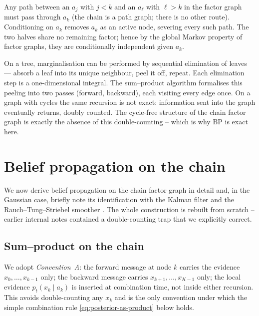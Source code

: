 \documentclass[11pt]{article}
\theoremstyle{definition}
\begin{document}
\begin{derivation}
Any path between an \(a_j\) with \(j < k\) and an \(a_\ell\) with
\(\ell > k\) in the factor graph must pass through \(a_k\) (the chain
is a path graph; there is no other route). Conditioning on \(a_k\)
removes \(a_k\) as an active node, severing every such path. The two
halves share no remaining factor; hence by the global Markov property
of factor graphs, they are conditionally independent given \(a_k\).
\end{derivation}

\begin{intuition}
On a tree, marginalisation can be performed by sequential elimination
of leaves --- absorb a leaf into its unique neighbour, peel it off,
repeat. Each elimination step is a one-dimensional integral. The
sum--product algorithm \citep{Pearl1988, KschischangFreyLoeliger2001}
formalises this peeling into two passes (forward, backward), each
visiting every edge once. On a graph with cycles the same recursion
is not exact: information sent into the graph eventually returns,
doubly counted. The cycle-free structure of the chain factor graph is
exactly the absence of this double-counting -- which is why BP is
exact here.
\end{intuition}

\section{Belief propagation on the chain}\label{sec:bp}

We now derive belief propagation \citep{Pearl1988,
KschischangFreyLoeliger2001} on the chain factor graph in detail and,
in the Gaussian case, briefly note its identification with the Kalman
filter \citep{Kalman1960} and the Rauch--Tung--Striebel smoother
\citep{RauchTungStriebel1965}. The whole construction is rebuilt from
scratch -- earlier internal notes contained a double-counting trap
that we explicitly correct.

\subsection{Sum--product on the chain}

We adopt \emph{Convention~A}: the forward message at node \(k\)
carries the evidence \(x_0, \dots, x_{k - 1}\) only; the backward
message carries \(x_{k + 1}, \dots, x_{K - 1}\) only; the local
evidence \(p_t(x_k \mid a_k)\) is inserted at combination time, not
inside either recursion. This avoids double-counting any \(x_k\) and
is the only convention under which the simple combination rule
\eqref{eq:posterior-as-product} below holds.
\end{document}

